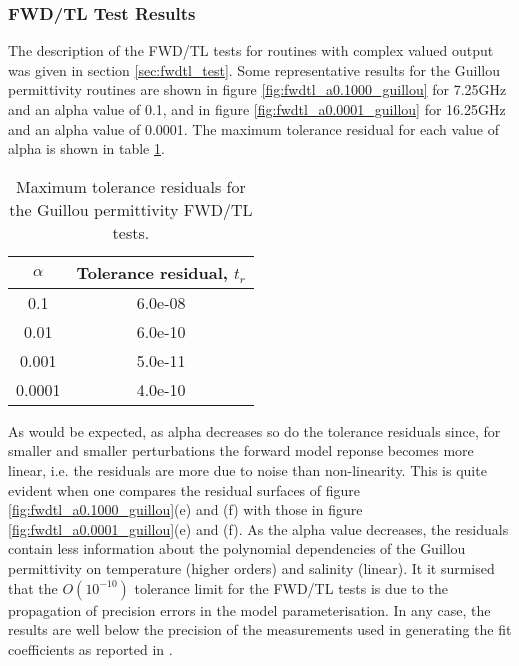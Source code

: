 \subsubsection{FWD/TL Test Results}
\label{sec:fwdtl_guillou}
The description of the FWD/TL tests for routines with complex valued output was given in section \ref{sec:fwdtl_test}. Some representative results for the Guillou permittivity routines are shown in figure \ref{fig:fwdtl_a0.1000_guillou} for 7.25GHz and an alpha value of 0.1, and in figure \ref{fig:fwdtl_a0.0001_guillou} for 16.25GHz and an alpha value of 0.0001. The maximum tolerance residual for each value of alpha is shown in table \ref{tab:fwdtl_guillou_alpha}.
\begin{table}[htp]
  \centering
  \begin{tabular}{| c | c |}
    \hline
    \boldmath$\alpha$\unboldmath & \textbf{Tolerance residual,} \boldmath$t_r$\unboldmath \\
    \hline\hline
    0.1    & 6.0e-08 \\
    0.01   & 6.0e-10 \\
    0.001  & 5.0e-11 \\
    0.0001 & 4.0e-10 \\
    \hline
  \end{tabular}
  \caption{Maximum tolerance residuals for the Guillou permittivity FWD/TL tests.}
  \label{tab:fwdtl_guillou_alpha}
\end{table}
As would be expected, as alpha decreases so do the tolerance residuals since, for smaller and smaller perturbations the forward model reponse becomes more linear, i.e. the residuals are more due to noise than non-linearity. This is quite evident when one compares the residual surfaces of figure \ref{fig:fwdtl_a0.1000_guillou}(e) and (f) with those in figure \ref{fig:fwdtl_a0.0001_guillou}(e) and (f). As the alpha value decreases, the residuals contain less information about the polynomial dependencies of the Guillou permittivity on temperature (higher orders) and salinity (linear). It it surmised that the $O(10^{-10})$ tolerance limit for the FWD/TL tests is due to the propagation of precision errors in the model parameterisation. In any case, the results are well below the precision of the measurements used in generating the fit coefficients as reported in \citet{Guillou_1998}.

